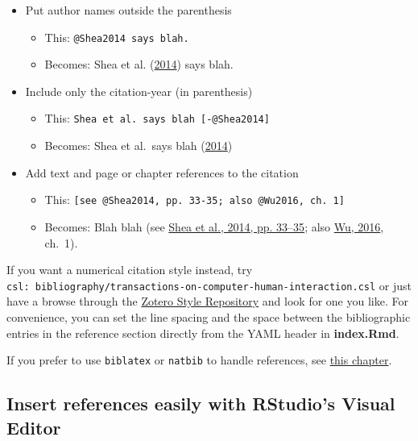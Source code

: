 \documentclass[a4paper, nobind]{templates/ociamthesis}
\providecommand{\tightlist}{%
  \setlength{\itemsep}{0pt}\setlength{\parskip}{0pt}}
\begin{document}
\begin{itemize}
\tightlist
\item
  Put author names outside the parenthesis

  \begin{itemize}
  \tightlist
  \item
    This: \texttt{@Shea2014\ says\ blah.}
  \item
    Becomes: Shea et al. (\protect\hyperlink{ref-Shea2014}{2014}) says blah.
  \end{itemize}
\item
  Include only the citation-year (in parenthesis)

  \begin{itemize}
  \tightlist
  \item
    This: \texttt{Shea\ et\ al.\ says\ blah\ {[}-@Shea2014{]}}
  \item
    Becomes: Shea et al.~says blah (\protect\hyperlink{ref-Shea2014}{2014})
  \end{itemize}
\item
  Add text and page or chapter references to the citation

  \begin{itemize}
  \tightlist
  \item
    This: \texttt{{[}see\ @Shea2014,\ pp.\ 33-35;\ also\ @Wu2016,\ ch.\ 1{]}}
  \item
    Becomes: Blah blah (see \protect\hyperlink{ref-Shea2014}{Shea et al., 2014, pp. 33--35}; also \protect\hyperlink{ref-Wu2016}{Wu, 2016}, ch.~1).
  \end{itemize}
\end{itemize}

If you want a numerical citation style instead, try \texttt{csl:\ bibliography/transactions-on-computer-human-interaction.csl} or just have a browse through the \href{https://www.zotero.org/styles}{Zotero Style Repository} and look for one you like.
For convenience, you can set the line spacing and the space between the bibliographic entries in the reference section directly from the YAML header in \textbf{index.Rmd}.

If you prefer to use \texttt{biblatex} or \texttt{natbib} to handle references, see \protect\hyperlink{customising-citations}{this chapter}.

\clearpage

\hypertarget{insert-references-easily-with-rstudios-visual-editor}{%
\subsection{Insert references easily with RStudio's Visual Editor}\label{insert-references-easily-with-rstudios-visual-editor}}
\end{document}
